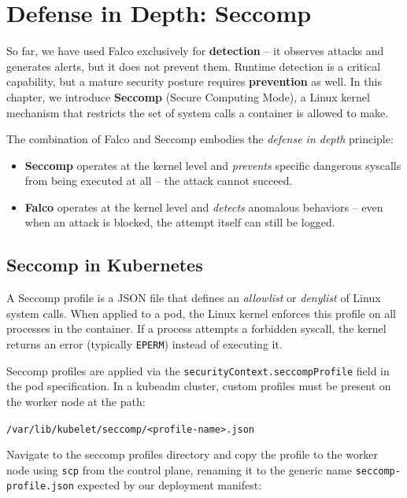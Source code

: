 \chapter{Defense in Depth: Seccomp}

So far, we have used Falco exclusively for \textbf{detection} -- it observes attacks and generates alerts, but it does not prevent them. Runtime detection is a critical capability, but a mature security posture requires \textbf{prevention} as well. In this chapter, we introduce \textbf{Seccomp} (Secure Computing Mode), a Linux kernel mechanism that restricts the set of system calls a container is allowed to make.

The combination of Falco and Seccomp embodies the \textit{defense in depth} principle:
\begin{itemize}
    \item \textbf{Seccomp} operates at the kernel level and \textit{prevents} specific dangerous syscalls from being executed at all -- the attack cannot succeed.
    \item \textbf{Falco} operates at the kernel level and \textit{detects} anomalous behaviors -- even when an attack is blocked, the attempt itself can still be logged.
\end{itemize}

\section{Seccomp in Kubernetes}

A Seccomp profile is a JSON file that defines an \textit{allowlist} or \textit{denylist} of Linux system calls. When applied to a pod, the Linux kernel enforces this profile on all processes in the container. If a process attempts a forbidden syscall, the kernel returns an error (typically \texttt{EPERM}) instead of executing it.

Seccomp profiles are applied via the \texttt{securityContext.seccompProfile} field in the pod specification. In a kubeadm cluster, custom profiles must be present on the worker node at the path:

\begin{center}
\texttt{/var/lib/kubelet/seccomp/<profile-name>.json}
\end{center}

Navigate to the seccomp profiles directory and copy the profile to the worker node using \texttt{scp} from the control plane, renaming it to the generic name \texttt{seccomp-profile.json} expected by our deployment manifest:

